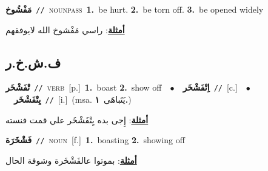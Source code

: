 \documentclass[10pt,a4paper,twoside]{article} %
\begin{document}
\begin{multicols}{2}
{\setlength\topsep{0pt}\textbf{\foreignlanguage{arabic}{مَفْشُوخ}}\ {\color{gray}\texttt{//}\color{black}}\ \textsc{noun\textunderscore pass}\ \textbf{1.}~be hurt.  \textbf{2.}~be torn off.  \textbf{3.}~be opened widely\  \begin{flushright}\color{gray}\foreignlanguage{arabic}{\textbf{\underline{\foreignlanguage{arabic}{أمثلة}}}: راسي مَفْشوخ الله لايوفقهم}\end{flushright}\color{black}} \vspace{2mm}

\vspace{-3mm}
\subsection*{\color{blue}\foreignlanguage{arabic}{ف.ش.خ.ر}\color{blue}{}} 

{\setlength\topsep{0pt}\textbf{\foreignlanguage{arabic}{تْفَشْخَر}}\ {\color{gray}\texttt{//}\color{black}}\ \textsc{verb}\ [p.]\ \textbf{1.}~boast  \textbf{2.}~show off\ \ $\bullet$\ \ \setlength\topsep{0pt}\textbf{\foreignlanguage{arabic}{اِتْفَشْخَر}}\ {\color{gray}\texttt{//}\color{black}}\ [c.]\ \ $\bullet$\ \ \setlength\topsep{0pt}\textbf{\foreignlanguage{arabic}{يِتْفَشْخَر}}\ {\color{gray}\texttt{//}\color{black}}\ [i.]\ \color{gray}(msa. \foreignlanguage{arabic}{يَتَباهَى}~\foreignlanguage{arabic}{\textbf{١.}})\color{black}\  \begin{flushright}\color{gray}\foreignlanguage{arabic}{\textbf{\underline{\foreignlanguage{arabic}{أمثلة}}}: إِجى بده يِتْفَشْخَر علي قمت فنسته}\end{flushright}\color{black}} \vspace{2mm}

{\setlength\topsep{0pt}\textbf{\foreignlanguage{arabic}{فَشْخَرَة}}\ {\color{gray}\texttt{//}\color{black}}\ \textsc{noun}\ [f.]\ \textbf{1.}~boasting  \textbf{2.}~showing off\  \begin{flushright}\color{gray}\foreignlanguage{arabic}{\textbf{\underline{\foreignlanguage{arabic}{أمثلة}}}: بموتوا عالفَشْخَرة وشوفة الحال}\end{flushright}\color{black}} \vspace{2mm}


\end{multicols}
\end{document}
